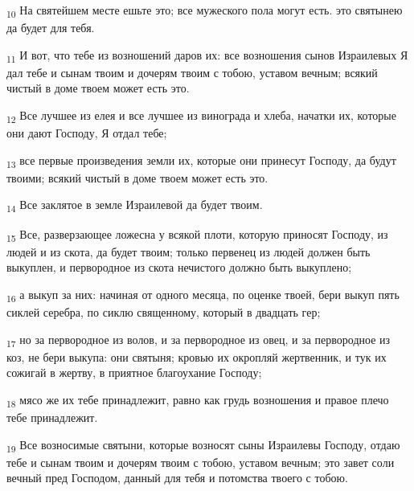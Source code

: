 \begin{tcolorbox}
\textsubscript{10} На святейшем месте ешьте это; все мужеского пола могут есть. это святынею да будет для тебя.
\end{tcolorbox}
\begin{tcolorbox}
\textsubscript{11} И вот, что тебе из возношений даров их: все возношения сынов Израилевых Я дал тебе и сынам твоим и дочерям твоим с тобою, уставом вечным; всякий чистый в доме твоем может есть это.
\end{tcolorbox}
\begin{tcolorbox}
\textsubscript{12} Все лучшее из елея и все лучшее из винограда и хлеба, начатки их, которые они дают Господу, Я отдал тебе;
\end{tcolorbox}
\begin{tcolorbox}
\textsubscript{13} все первые произведения земли их, которые они принесут Господу, да будут твоими; всякий чистый в доме твоем может есть это.
\end{tcolorbox}
\begin{tcolorbox}
\textsubscript{14} Все заклятое в земле Израилевой да будет твоим.
\end{tcolorbox}
\begin{tcolorbox}
\textsubscript{15} Все, разверзающее ложесна у всякой плоти, которую приносят Господу, из людей и из скота, да будет твоим; только первенец из людей должен быть выкуплен, и первородное из скота нечистого должно быть выкуплено;
\end{tcolorbox}
\begin{tcolorbox}
\textsubscript{16} а выкуп за них: начиная от одного месяца, по оценке твоей, бери выкуп пять сиклей серебра, по сиклю священному, который в двадцать гер;
\end{tcolorbox}
\begin{tcolorbox}
\textsubscript{17} но за первородное из волов, и за первородное из овец, и за первородное из коз, не бери выкупа: они святыня; кровью их окропляй жертвенник, и тук их сожигай в жертву, в приятное благоухание Господу;
\end{tcolorbox}
\begin{tcolorbox}
\textsubscript{18} мясо же их тебе принадлежит, равно как грудь возношения и правое плечо тебе принадлежит.
\end{tcolorbox}
\begin{tcolorbox}
\textsubscript{19} Все возносимые святыни, которые возносят сыны Израилевы Господу, отдаю тебе и сынам твоим и дочерям твоим с тобою, уставом вечным; это завет соли вечный пред Господом, данный для тебя и потомства твоего с тобою.
\end{tcolorbox}
